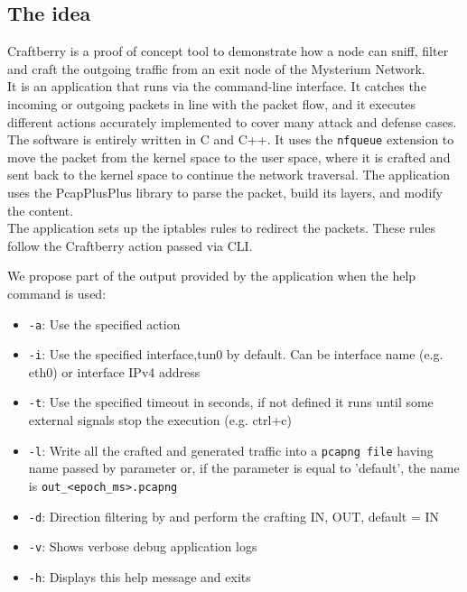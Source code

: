 \documentclass[12pt]{article}
\begin{document}
	\subsection{The idea}
	Craftberry is a proof of concept tool to demonstrate how a node can sniff, filter and craft the outgoing traffic from an exit node of the Mysterium Network.\\
	It is an application that runs via the command-line interface. It catches the incoming or outgoing packets in line with the packet flow, and it executes different actions accurately implemented to cover many attack and defense cases.\\
	The software is entirely written in C and C++. It uses the \lstinline{nfqueue} extension to move the packet from the kernel space to the user space, where it is crafted and sent back to the kernel space to continue the network traversal. The application uses the PcapPlusPlus library to parse the packet, build its layers, and modify the content.\\
	The application sets up the iptables rules to redirect the packets. These rules follow the Craftberry action passed via CLI.\\
	\bigbreak

	We propose part of the output provided by the application when the help command is used:
	\begin{itemize}
		\item \lstinline{-a}: Use the specified action
		\item  \lstinline{-i}: Use the specified interface,tun0 by default. Can be interface name (e.g. eth0) or interface IPv4 address
		\item  \lstinline{-t}: Use the specified timeout in seconds, if not defined it runs until some external signals stop the execution (e.g. ctrl+c)
		\item  \lstinline{-l}: Write all the crafted and generated traffic into a \lstinline{pcapng file} having name passed by parameter or, if the parameter is equal to 'default', the name is \lstinline{out_<epoch_ms>.pcapng}
		\item  \lstinline{-d}: Direction filtering by and perform the crafting {IN, OUT}, default = IN
		\item  \lstinline{-v}: Shows verbose debug application logs
		\item  \lstinline{-h}: Displays this help message and exits
	\end{itemize}
	
	\bigbreak
		
\end{document}
